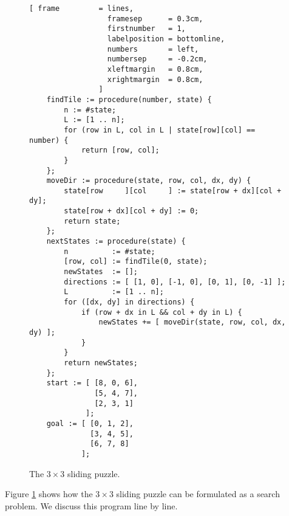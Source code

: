 \begin{figure}[!ht]
\centering
\begin{Verbatim}[ frame         = lines,
                  framesep      = 0.3cm,
                  firstnumber   = 1,
                  labelposition = bottomline,
                  numbers       = left,
                  numbersep     = -0.2cm,
                  xleftmargin   = 0.8cm,
                  xrightmargin  = 0.8cm,
                ]
    findTile := procedure(number, state) {
        n := #state;
        L := [1 .. n];
        for (row in L, col in L | state[row][col] == number) {
            return [row, col];
        }
    };
    moveDir := procedure(state, row, col, dx, dy) {
        state[row     ][col     ] := state[row + dx][col + dy];
        state[row + dx][col + dy] := 0;
        return state;
    };
    nextStates := procedure(state) {
        n          := #state;
        [row, col] := findTile(0, state);
        newStates  := [];
        directions := [ [1, 0], [-1, 0], [0, 1], [0, -1] ];
        L          := [1 .. n];
        for ([dx, dy] in directions) {
            if (row + dx in L && col + dy in L) {
                newStates += [ moveDir(state, row, col, dx, dy) ];
            }
        }
        return newStates;
    };
    start := [ [8, 0, 6],
               [5, 4, 7],
               [2, 3, 1]
             ];
    goal := [ [0, 1, 2],
              [3, 4, 5],
              [6, 7, 8]
            ];
\end{Verbatim}
\vspace*{-0.3cm}
\caption{The $3 \times 3$ sliding puzzle.}
\label{fig:sliding-puzzle.stlx}
\end{figure}
Figure \ref{fig:sliding-puzzle.stlx} shows how the $3 \times 3$ sliding puzzle can be formulated as
a search problem.  We discuss this program line by line.
